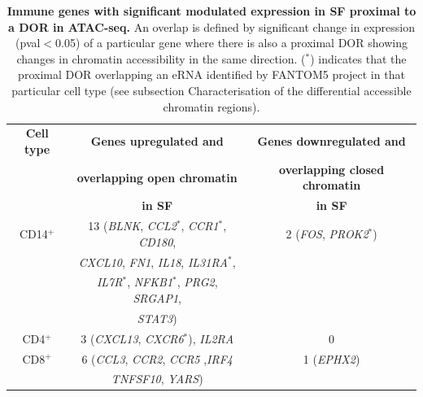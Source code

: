 \begin{table}[htbp]
\centering
\begin{tabular}{@{} c c c}
\toprule
\textbf{Cell type} & \textbf{Genes upregulated and}        &  \textbf{Genes downregulated and} \\
                   & \textbf{overlapping open chromatin}   &  \textbf{ overlapping closed chromatin} \\
									 &	\textbf{ in SF}				               &  \textbf{in SF} \\
\midrule
\midrule
CD14$^+$ & 13 (\textit{BLNK}, \textit{CCL2$^\ast$}, \textit{CCR1$^\ast$}, \textit{CD180}, & 2 (\textit{FOS}, \textit{PROK2$^\ast$}) \\
				 & \textit{CXCL10}, \textit{FN1}, \textit{IL18}, \textit{IL31RA$^\ast$},    & \\
				 & \textit{IL7R$^\ast$}, \textit{NFKB1$^\ast$}, \textit{PRG2}, \textit{SRGAP1}, & \\
				 & \textit{STAT3}) & \\
				
\midrule
CD4$^+$ & 3 (\textit{CXCL13}, \textit{CXCR6$^\ast$}), \textit{IL2RA}& 0 \\

\midrule
CD8$^+$ & 6 (\textit{CCL3}, \textit{CCR2}, \textit{CCR5} ,\textit{IRF4} & 1 (\textit{EPHX2}) \\
        & \textit{TNFSF10}, \textit{YARS}) & \\

\bottomrule
\end{tabular}
\medskip %
\caption[Immune genes with significant modulated expression in SF proximal to a DOR in ATAC-seq.]{\textbf{Immune genes with significant modulated expression in SF proximal to a DOR in ATAC-seq.} An overlap is defined by significant change in expression (pval$<$0.05) of a particular gene where there is also a proximal DOR showing changes in chromatin accessibility in the same direction. ($^\ast$) indicates that the proximal DOR overlapping an eRNA identified by FANTOM5 project in that particular cell type (see subsection Characterisation of the differential accessible chromatin regions).}
\label{tab:PSA_gene_expression_ATAC_overlap}
\end{table}

